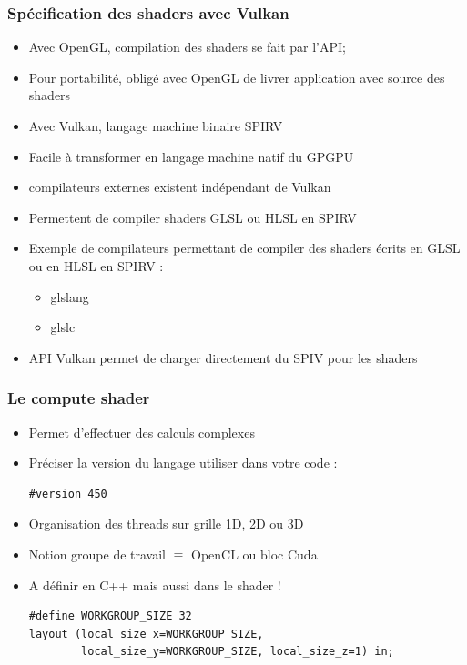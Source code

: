 \documentclass{beamer}
\begin{document}
\begin{frame}[fragile]
\frametitle{Spécification des shaders avec Vulkan}

\begin{itemize}
\item Avec OpenGL, compilation des shaders se fait par l'API;
\item Pour portabilité, obligé avec OpenGL de livrer application avec source des shaders
\item Avec Vulkan, langage machine binaire SPIRV
\item Facile à transformer en langage machine natif du GPGPU
\item compilateurs externes existent indépendant de Vulkan
\item Permettent de compiler shaders GLSL ou HLSL en SPIRV
\item Exemple de compilateurs permettant de compiler des shaders écrits en GLSL ou en HLSL en SPIRV :
  \begin{itemize}
  \item \textcolor{NavyBlue}{glslang}
  \item \textcolor{NavyBlue}{glslc}
  \end{itemize}
\item API Vulkan permet de charger directement du SPIV pour les shaders
\end{itemize}
\end{frame}

\begin{frame}[fragile]
\frametitle{Le compute shader}
\lstset{style=customglsl}

\begin{itemize}
\item Permet d'effectuer des calculs complexes
\item Préciser la version du langage utiliser dans votre code :
\begin{lstlisting}
#version 450
\end{lstlisting}
\item Organisation des threads sur grille 1D, 2D ou 3D
\item Notion groupe de travail $\equiv$ OpenCL ou bloc Cuda
\item A définir en C++ mais aussi dans le shader !

\begin{lstlisting}
#define WORKGROUP_SIZE 32
layout (local_size_x=WORKGROUP_SIZE, 
        local_size_y=WORKGROUP_SIZE, local_size_z=1) in;
\end{lstlisting}
\end{itemize}
\end{frame}
\end{document}
